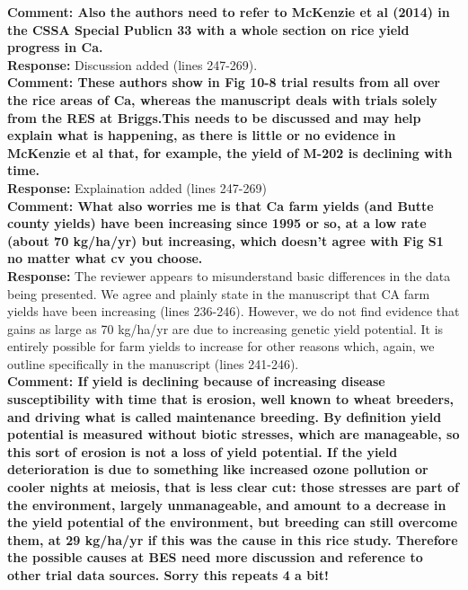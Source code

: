 \documentclass{article} \usepackage[margin=1in]{geometry}
\begin{document}
\textbf{Comment: Also the authors need to refer to McKenzie et al (2014) in the CSSA
  Special Publicn 33 with a whole section on rice yield progress in
  Ca.}\\

\textbf{Response:} Discussion added (lines 247-269). \\

\textbf{Comment: These authors show in Fig 10-8 trial results from all over the
  rice areas of Ca, whereas the manuscript deals with trials solely
  from the RES at Briggs.This needs to be discussed and may help
  explain what is happening, as there is little or no evidence in
  McKenzie et al that, for example, the yield of M-202 is declining
  with time.}\\

\textbf{Response:} Explaination added (lines 247-269)\\

\textbf{Comment: What also worries me is that Ca farm yields (and Butte
  county yields) have been increasing since 1995 or so, at a low rate
  (about 70 kg/ha/yr) but increasing, which doesn’t agree with Fig S1
  no matter what cv you choose.}\\

\textbf{Response:} The reviewer appears to misunderstand basic
differences in the data being presented. We agree and plainly state in
the manuscript that CA farm yields have been increasing (lines 236-246). However, we do not find evidence that gains as large as 70 kg/ha/yr
are due to increasing genetic yield potential. It is entirely possible
for farm yields to increase for other reasons which, again, we outline
specifically in the manuscript (lines 241-246).\\

\textbf{Comment: If yield is declining because of increasing disease susceptibility
  with time that is erosion, well known to wheat breeders, and driving
  what is called maintenance breeding. By definition yield potential is
  measured without biotic stresses, which are manageable, so this sort
  of erosion is not a loss of yield potential. If the yield
  deterioration is due to something like increased ozone pollution or
  cooler nights at meiosis, that is less clear cut: those stresses are
  part of the environment, largely unmanageable, and amount to a
  decrease in the yield potential of the environment, but breeding can
  still overcome them, at 29 kg/ha/yr if this was the cause in this rice
  study. Therefore the possible causes at BES need more discussion and
  reference to other trial data sources. Sorry this repeats 4 a bit!}\\
\end{document}
